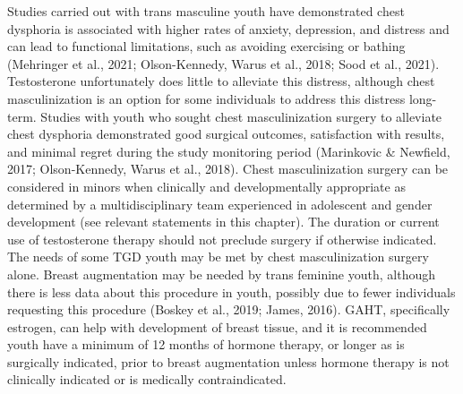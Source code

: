 \documentclass[
]{book}
\begin{document}
Studies carried out with trans masculine youth
have demonstrated chest dysphoria is associated
with higher rates of anxiety, depression, and distress and can lead to functional limitations, such
as avoiding exercising or bathing (Mehringer
et al., 2021; Olson-Kennedy, Warus et al., 2018;
Sood et al., 2021). Testosterone unfortunately
does little to alleviate this distress, although chest
masculinization is an option for some individuals
to address this distress long-term. Studies with
youth who sought chest masculinization surgery
to alleviate chest dysphoria demonstrated good
surgical outcomes, satisfaction with results, and
minimal regret during the study monitoring
period (Marinkovic \& Newfield, 2017;
Olson-Kennedy, Warus et al., 2018). Chest masculinization surgery can be considered in minors
when clinically and developmentally appropriate
as determined by a multidisciplinary team experienced in adolescent and gender development
(see relevant statements in this chapter). The
duration or current use of testosterone therapy
should not preclude surgery if otherwise indicated. The needs of some TGD youth may be
met by chest masculinization surgery alone.
Breast augmentation may be needed by trans
feminine youth, although there is less data about
this procedure in youth, possibly due to fewer
individuals requesting this procedure (Boskey
et al., 2019; James, 2016). GAHT, specifically
estrogen, can help with development of breast
tissue, and it is recommended youth have a minimum of 12 months of hormone therapy, or longer as is surgically indicated, prior to breast
augmentation unless hormone therapy is not
clinically indicated or is medically
contraindicated.
\end{document}

